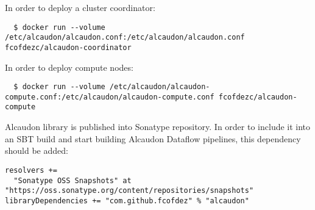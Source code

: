 In order to deploy a cluster coordinator:

\begin{lstlisting}
  $ docker run --volume /etc/alcaudon/alcaudon.conf:/etc/alcaudon/alcaudon.conf fcofdezc/alcaudon-coordinator
\end{lstlisting}

In order to deploy compute nodes:

\begin{lstlisting}
  $ docker run --volume /etc/alcaudon/alcaudon-compute.conf:/etc/alcaudon/alcaudon-compute.conf fcofdezc/alcaudon-compute
\end{lstlisting}

Alcaudon library is published into Sonatype repository. In order to include it into
an SBT build and start building Alcaudon Dataflow pipelines, this dependency should be added:

\begin{lstlisting}
resolvers +=
  "Sonatype OSS Snapshots" at "https://oss.sonatype.org/content/repositories/snapshots"
libraryDependencies += "com.github.fcofdez" % "alcaudon"
\end{lstlisting}


